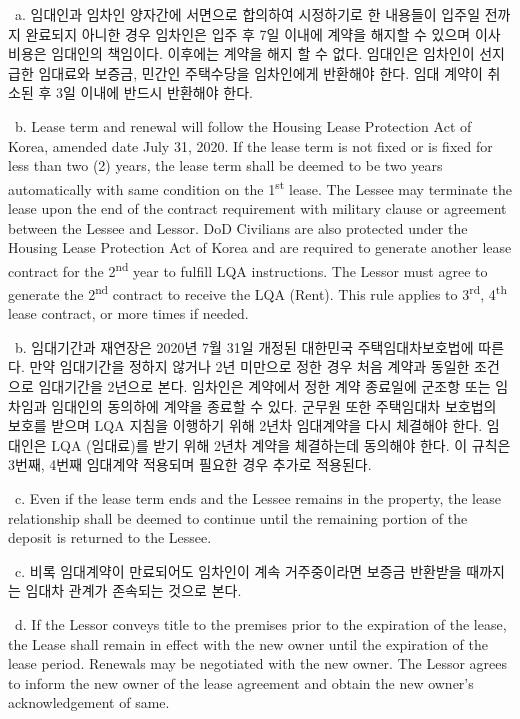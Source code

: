 \documentclass[10pt, letterpaper]{article}
\newcommand{\ul}[1]{\underline{\makebox[#1]{}}}
\newcommand{\init}{\ul{1cm}\ }
\begin{document}
\init a. 임대인과 임차인 양자간에 서면으로 합의하여 시정하기로 한 내용들이 입주일 전까지 완료되지 아니한 경우 임차인은 입주 후 7일 이내에 계약을 해지할 수 있으며 이사비용은 임대인의 책임이다. 이후에는 계약을 해지 할 수 없다. 임대인은 임차인이 선지급한 임대료와 보증금, 민간인 주택수당을 임차인에게 반환해야 한다. 임대 계약이 취소된 후 3일 이내에 반드시 반환해야 한다.

\vspace{3pt}

\init b. Lease term and renewal will follow the Housing Lease Protection Act of Korea, amended date July 31, 2020. If the lease term is not fixed or is fixed for less than two (2) years, the lease term shall be deemed to be two years automatically with same condition on the 1\textsuperscript{st} lease. The Lessee may terminate the lease upon the end of the contract requirement with military clause or agreement between the Lessee and Lessor. DoD Civilians are also protected under the Housing Lease Protection Act of Korea and are required to generate another lease contract for the 2\textsuperscript{nd} year to fulfill LQA instructions. The Lessor must agree to generate the 2\textsuperscript{nd} contract to receive the LQA (Rent). This rule applies to 3\textsuperscript{rd}, 4\textsuperscript{th} lease contract, or more times if needed.

\init b. 임대기간과 재연장은 2020년 7월 31일 개정된 대한민국 주택임대차보호법에 따른다. 만약 임대기간을 정하지 않거나 2년 미만으로 정한 경우 처음 계약과 동일한 조건으로 임대기간을 2년으로 본다. 임차인은 계약에서 정한 계약 종료일에 군조항 또는 임차임과 임대인의 동의하에 계약을 종료할 수 있다. 군무원 또한 주택임대차 보호법의 보호를 받으며 LQA 지침을 이행하기 위해 2년차 임대계약을 다시 체결해야 한다. 임대인은 LQA (임대료)를 받기 위해 2년차 계약을 체결하는데 동의해야 한다. 이 규칙은 3번째, 4번째 임대계약 적용되며 필요한 경우 추가로 적용된다.

\vspace{3pt}

\init c. Even if the lease term ends and the Lessee remains in the property, the lease relationship shall be deemed to continue until the remaining portion of the deposit is returned to the Lessee.

\init c. 비록 임대계약이 만료되어도 임차인이 계속 거주중이라면 보증금 반환받을 때까지는 임대차 관계가 존속되는 것으로 본다.

\vspace{3pt}

\init d. If the Lessor conveys title to the premises prior to the expiration of the lease, the Lease shall remain in effect with the new owner until the expiration of the lease period. Renewals may be negotiated with the new owner. The Lessor agrees to inform the new owner of the lease agreement and obtain the new owner's acknowledgement of same.
\end{document}

